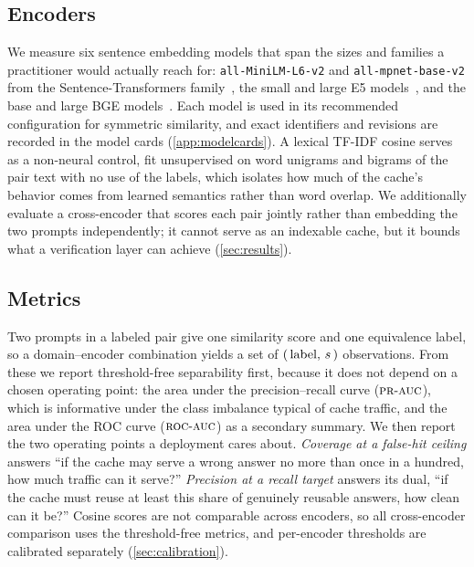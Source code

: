 \subsection{Encoders}
We measure six sentence embedding models that span the sizes and families a practitioner
would actually reach for: \texttt{all-MiniLM-L6-v2} and \texttt{all-mpnet-base-v2} from
the Sentence-Transformers family~\cite{reimers2019sentencebert,song2020mpnet}, the small
and large \mbox{E5} models~\cite{wang2022e5}, and the base and large \mbox{BGE}
models~\cite{xiao2023cpack}. Each model is used in its recommended configuration for
symmetric similarity, and exact identifiers and revisions are recorded in the model
cards (\cref{app:modelcards}). A lexical \mbox{TF-IDF} cosine serves as a non-neural
control, fit unsupervised on word unigrams and bigrams of the pair text with no use of the
labels, which isolates how much of the cache's behavior comes from learned semantics rather
than word overlap. We additionally evaluate a cross-encoder that scores each pair jointly
rather than embedding the two prompts independently; it cannot serve as an indexable cache,
but it bounds what a verification layer can achieve (\cref{sec:results}).

\subsection{Metrics}
Two prompts in a labeled pair give one similarity score and one equivalence label, so a
domain--encoder combination yields a set of $(\,\text{label},\, s\,)$ observations.
From these we report threshold-free separability first, because it does not depend on a
chosen operating point: the area under the precision--recall curve ($\textsc{pr}\text{-}\textsc{auc}$), which is
informative under the class imbalance typical of cache traffic, and the area under the
\mbox{ROC} curve ($\textsc{roc}\text{-}\textsc{auc}$) as a secondary summary. We then report the two operating
points a deployment cares about. \emph{Coverage at a false-hit ceiling} answers ``if the
cache may serve a wrong answer no more than once in a hundred, how much traffic can it
serve?'' \emph{Precision at a recall target} answers its dual, ``if the cache must reuse
at least this share of genuinely reusable answers, how clean can it be?'' Cosine scores
are not comparable across encoders, so all cross-encoder comparison uses the
threshold-free metrics, and per-encoder thresholds are calibrated separately
(\cref{sec:calibration}).

